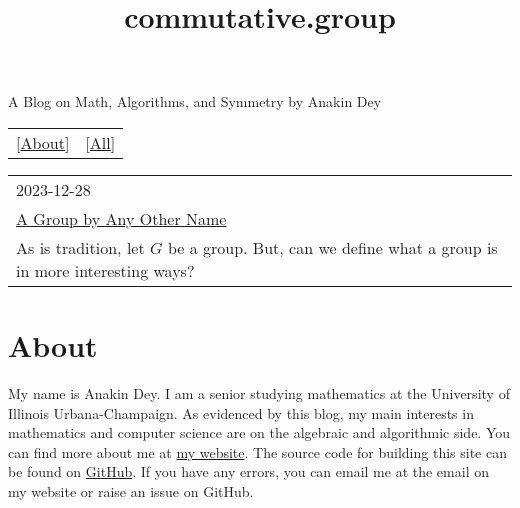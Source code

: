 \documentclass{article}
\title{commutative.group}
\begin{document}
\maketitle
\newline
\begin{center}
  A Blog on Math, Algorithms, and Symmetry by Anakin Dey
\end{center}
\begin{table}
  \centering
  \begin{tabular}{cc}
    \LARGE[\href{About.html}{About}] & \LARGE[\href{All-Posts.html}{All}]
  \end{tabular}
\end{table}


\begin{table}
  \centering
  \begin{tabular}{|l|}
    \hline
    \large 2023-12-28 \\
    \LARGE \href{posts/other_name.html}{A Group by Any Other Name} \\
    As is tradition, let $G$ be a group. But, can we define what a group is in more interesting ways? \\
    \hline
  \end{tabular}
\end{table}

\part*{\centering About}

\newline

My name is Anakin Dey.
I am a senior studying mathematics at the University of Illinois Urbana-Champaign.
As evidenced by this blog, my main interests in mathematics and computer science are on the algebraic and algorithmic side.
You can find more about me at \href{https://www.anakin-dey.com/}{my website}.
The source code for building this site can be found on \href{https://github.com/Spamakin/abel}{GitHub}.
If you have any errors, you can email me at the email on my website or raise an issue on GitHub.
\end{document}
